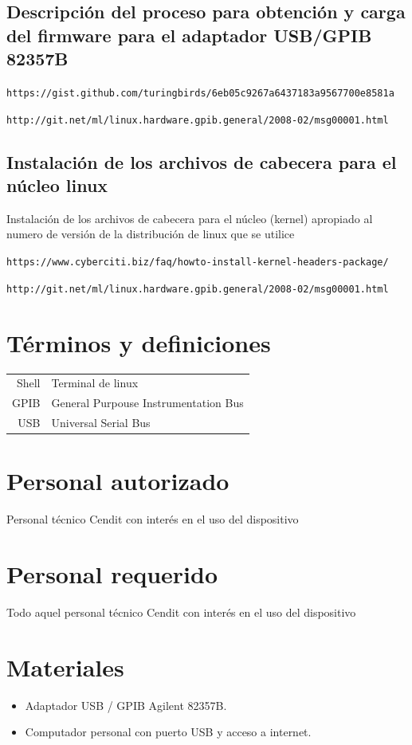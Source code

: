 \documentclass[paper=letter,oneside,fontsize=11pt]{article}
\begin{document}
	
	\subsection{Descripción del proceso para obtención y carga del firmware para el adaptador USB/GPIB 82357B}
	
	\texttt{https://gist.github.com/turingbirds/6eb05c9267a6437183a9567700e8581a}
	
	\texttt{http://git.net/ml/linux.hardware.gpib.general/2008-02/msg00001.html}
	
	\subsection{Instalación de los archivos de cabecera para el núcleo linux}

	Instalación de los  archivos de cabecera para el núcleo (kernel) apropiado al numero de versión de la distribución de linux que se utilice
	
	\texttt{https://www.cyberciti.biz/faq/howto-install-kernel-headers-package/}
	
	\texttt{http://git.net/ml/linux.hardware.gpib.general/2008-02/msg00001.html}
	
	\section{Términos y definiciones}
	
	\begin{tabular}{rl}
		Shell 	& 	Terminal de linux \\
		GPIB 	& 	General Purpouse Instrumentation Bus \\
		USB		&  	Universal Serial Bus \\
	\end{tabular}
	
	\section{Personal autorizado}	
		Personal técnico Cendit con interés en el uso del dispositivo
		
	\section{Personal requerido}	
		Todo aquel personal técnico Cendit con interés en el uso del dispositivo
		
	\section{Materiales}
		\label{Sec:SeccionMateriales}
		\begin{itemize}
			\item Adaptador USB / GPIB Agilent 82357B.
			\item Computador personal con puerto USB y acceso a internet.
		\end{itemize}	
			
\end{document}
